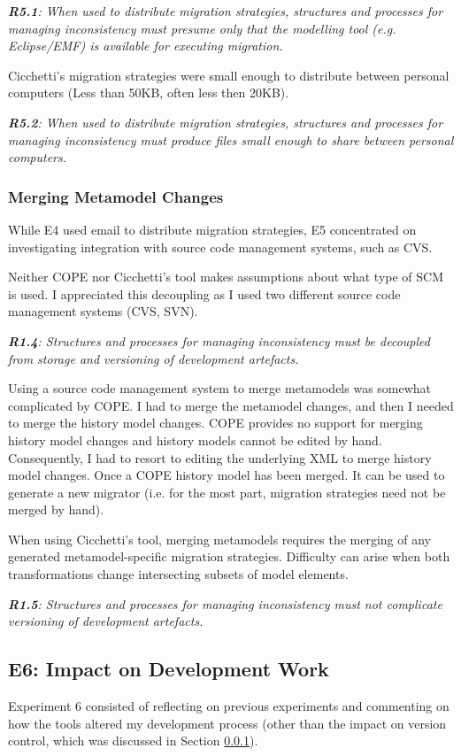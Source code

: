 \documentclass[a4paper]{article}
\begin{document}
\emph{\textbf{R5.1}: When used to distribute migration strategies, structures and processes for managing inconsistency must presume only that the modelling tool (e.g. Eclipse/EMF) is available for executing migration.}

Cicchetti's migration strategies were small enough to distribute between personal computers (Less than 50KB, often less then 20KB).

\emph{\textbf{R5.2}: When used to distribute migration strategies, structures and processes for managing inconsistency must produce files small enough to share between personal computers.}


\subsubsection{Merging Metamodel Changes}
\label{sssec:merging}
While E4 used email to distribute migration strategies, E5 concentrated on investigating integration with source code management systems, such as CVS.

Neither COPE nor Cicchetti's tool makes assumptions about what type of SCM is used. I appreciated this decoupling as I used two different source code management systems (CVS, SVN). 

\emph{\textbf{R1.4}: Structures and processes for managing inconsistency must be decoupled from storage and versioning of development artefacts.}

Using a source code management system to merge metamodels was somewhat complicated by COPE. I had to merge the metamodel changes, and then I needed to merge the history model changes. COPE provides no support for merging history model changes and history models cannot be edited by hand. Consequently, I had to resort to editing the underlying XML to merge history model changes. Once a COPE history model has been merged. It can be used to generate a new migrator (i.e. for the most part, migration strategies need not be merged by hand).

When using Cicchetti's tool, merging metamodels requires the merging of any generated metamodel-specific migration strategies. Difficulty can arise when both transformations change intersecting subsets of model elements.

\emph{\textbf{R1.5}: Structures and processes for managing inconsistency must not complicate versioning of development artefacts.}


\subsection{E6: Impact on Development Work}
Experiment 6 consisted of reflecting on previous experiments and commenting on how the tools altered my development process (other than the impact on version control, which was discussed in Section \ref{sssec:merging}).
\end{document}
